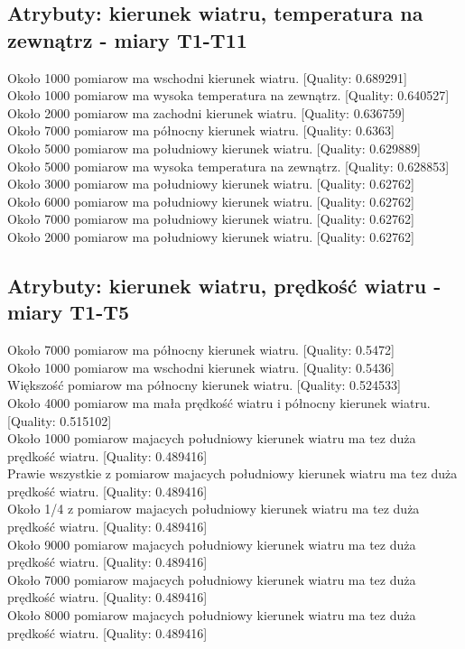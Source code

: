 \documentclass{classrep}
\begin{document}
\subsection{Atrybuty: kierunek wiatru, temperatura na zewnątrz - miary T1-T11}
Około 1000 pomiarow ma wschodni kierunek wiatru. [Quality: 0.689291]\\
Około 1000 pomiarow ma wysoka temperatura na zewnątrz. [Quality: 0.640527]\\
Około 2000 pomiarow ma zachodni kierunek wiatru. [Quality: 0.636759]\\
Około 7000 pomiarow ma północny kierunek wiatru. [Quality: 0.6363]\\
Około 5000 pomiarow ma południowy kierunek wiatru. [Quality: 0.629889]\\
Około 5000 pomiarow ma wysoka temperatura na zewnątrz. [Quality: 0.628853]\\
Około 3000 pomiarow ma południowy kierunek wiatru. [Quality: 0.62762]\\
Około 6000 pomiarow ma południowy kierunek wiatru. [Quality: 0.62762]\\
Około 7000 pomiarow ma południowy kierunek wiatru. [Quality: 0.62762]\\
Około 2000 pomiarow ma południowy kierunek wiatru. [Quality: 0.62762]\\

\subsection{Atrybuty: kierunek wiatru, prędkość wiatru - miary T1-T5}
Około 7000 pomiarow ma północny kierunek wiatru. [Quality: 0.5472]\\
Około 1000 pomiarow ma wschodni kierunek wiatru. [Quality: 0.5436]\\
Większość pomiarow ma północny kierunek wiatru. [Quality: 0.524533]\\
Około 4000 pomiarow ma mała prędkość wiatru i północny kierunek wiatru. [Quality: 0.515102]\\
Około 1000 pomiarow majacych południowy kierunek wiatru ma tez duża prędkość wiatru. [Quality: 0.489416]\\
Prawie wszystkie z pomiarow majacych południowy kierunek wiatru ma tez duża prędkość wiatru. [Quality: 0.489416]\\
Około 1/4 z pomiarow majacych południowy kierunek wiatru ma tez duża prędkość wiatru. [Quality: 0.489416]\\
Około 9000 pomiarow majacych południowy kierunek wiatru ma tez duża prędkość wiatru. [Quality: 0.489416]\\
Około 7000 pomiarow majacych południowy kierunek wiatru ma tez duża prędkość wiatru. [Quality: 0.489416]\\
Około 8000 pomiarow majacych południowy kierunek wiatru ma tez duża prędkość wiatru. [Quality: 0.489416]\\
\end{document}
